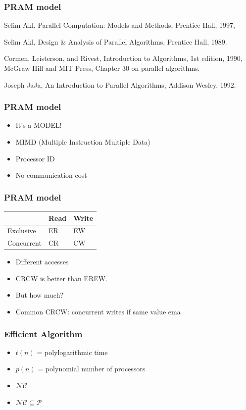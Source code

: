 \documentclass[14pt]{beamer}
\begin{document}
\begin{frame}\frametitle{PRAM model}

  Selim Akl, Parallel Computation: Models and Methods, Prentice Hall, 1997,

  Selim Akl, Design \& Analysis of Parallel Algorithms, Prentice Hall, 1989.

  Cormen, Leisterson, and Rivest, Introduction to Algorithms, 1st edition,
    1990, McGraw Hill and MIT Press, Chapter 30 on parallel algorithms.

    Joseph JaJa, An Introduction to Parallel Algorithms, Addison Wesley, 1992.
\end{frame}

\begin{frame}\frametitle{PRAM model}
  \begin{itemize}
  \item
    It's a \alert{MODEL}!
  \item
    MIMD (Multiple Instruction Multiple Data)
  \item
    Processor ID
  \item
    No communication cost
  \end{itemize}
\end{frame}

\begin{frame}\frametitle{PRAM model}
\begin{center}
  \begin{tabular}{|l|l|l|}
\hline
 & Read & Write \\
\hline
Exclusive & ER & EW \\
\hline
Concurrent & CR & CW \\
\hline
\end{tabular}

\begin{itemize}
\item
  Different accesses
  \item
    CRCW is better than EREW.
  \item
    But how much?
  \item
    Common CRCW: concurrent writes if same value ema
  \end{itemize}
\end{center}
\end{frame}


\begin{frame}\frametitle{Efficient Algorithm}
\begin{itemize}
\item
  $t(n)$ = polylogarithmic time
\item
  $p(n)$ = polynomial number of processors
\item
  $\mathcal{NC}$
\item
  $\mathcal{NC}\subseteq \mathcal{P}$
\end{itemize}
\end{frame}
\end{document}
